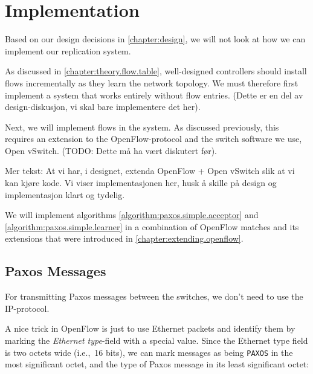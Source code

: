 \chapter{Implementation}
\label{chapter:implementation}

Based on our design decisions in \vref{chapter:design}, we will not look at
how we can implement our replication system.

As discussed in \vref{chapter:theory.flow.table}, well-designed controllers
should install flows incrementally as they learn the network topology.
%
We must therefore first implement a system that works entirely without flow
entries. (Dette er en del av design-diskusjon, vi skal bare implementere det
her).

Next, we will implement flows in the system. As discussed previously, this
requires an extension to the OpenFlow-protocol and the switch software we
use, Open vSwitch. (TODO: Dette må ha vært diskutert før).

Mer tekst: At vi har, i designet, extenda OpenFlow + Open vSwitch slik at vi
kan kjøre kode. Vi viser implementasjonen her, husk å skille på design og
implementasjon klart og tydelig.

\label{implementation.simplified.paxos}

We will implement algorithms \ref{algorithm:paxos.simple.acceptor} 
and \ref{algorithm:paxos.simple.learner} in a combination of OpenFlow
matches and its extensions that were introduced
in \vref{chapter:extending.openflow}.



\section{Paxos Messages}

For transmitting Paxos messages between the switches, we don't need to use
the IP-protocol.

A nice trick in OpenFlow is just to use Ethernet packets
and identify them by marking the \textit{Ethernet
  type}-field with a special value.
Since the Ethernet type field is two octets wide (i.e.,~16 bits), we can
mark messages as being \texttt{PAXOS} in the most significant octet, and the
type of Paxos message in its least significant octet:

